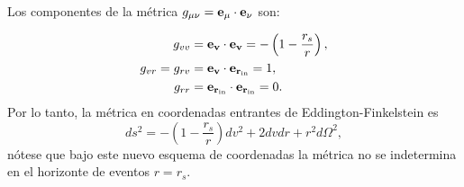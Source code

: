 Los componentes de la métrica \( g_{\mu\nu} = \mathbf{e_\mu} \cdot \mathbf{e_\nu} \) son:

\begin{equation}
    \begin{aligned}
        g_{vv}          & = \mathbf{e_v} \cdot \mathbf{e_v} = -\left(1 - \frac{r_s}{r}\right), \\
        g_{vr} = g_{rv} & = \mathbf{e_v} \cdot \mathbf{e_{r_{\text{in}}}} = 1,                 \\
        g_{rr}          & = \mathbf{e_{r_{\text{in}}}} \cdot \mathbf{e_{r_{\text{in}}}} = 0.
    \end{aligned}
\end{equation}
Por lo tanto, la métrica en coordenadas entrantes de Eddington-Finkelstein es
\begin{equation}
    ds^2 = -\left(1 - \frac{r_s}{r}\right) dv^2 + 2 dv dr + r^2 d\Omega^2,
\end{equation}
nótese que bajo este nuevo esquema de coordenadas la métrica no se indetermina en el horizonte de eventos \( r = r_s \).
